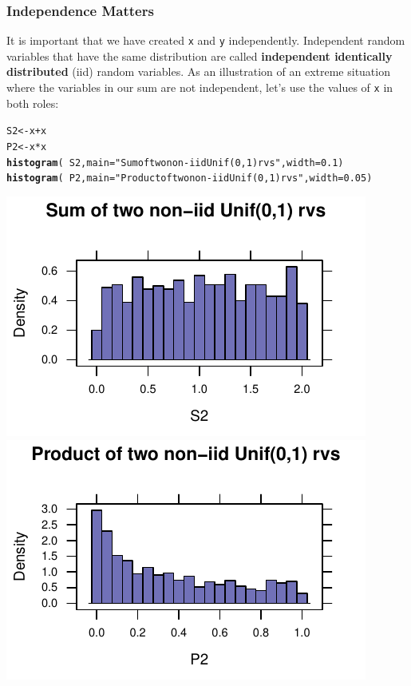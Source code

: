 \documentclass[twoside]{book}\usepackage[]{graphicx}\usepackage[]{xcolor}
\makeatletter
\def\maxwidth{ %
  \ifdim\Gin@nat@width>\linewidth
    \linewidth
  \else
    \Gin@nat@width
  \fi
}
\newcommand{\hlnum}[1]{\textcolor[rgb]{0.686,0.059,0.569}{#1}}%
\newcommand{\hlstr}[1]{\textcolor[rgb]{0.192,0.494,0.8}{#1}}%
\newcommand{\hlopt}[1]{\textcolor[rgb]{0,0,0}{#1}}%
\newcommand{\hlstd}[1]{\textcolor[rgb]{0.345,0.345,0.345}{#1}}%
\newcommand{\hlkwb}[1]{\textcolor[rgb]{0.69,0.353,0.396}{#1}}%
\newcommand{\hlkwc}[1]{\textcolor[rgb]{0.333,0.667,0.333}{#1}}%
\newcommand{\hlkwd}[1]{\textcolor[rgb]{0.737,0.353,0.396}{\textbf{#1}}}%
\newenvironment{kframe}{%
 \def\at@end@of@kframe{}%
 \ifinner\ifhmode%
  \def\at@end@of@kframe{\end{minipage}}%
  \begin{minipage}{\columnwidth}%
 \fi\fi%
 \def\FrameCommand##1{\hskip\@totalleftmargin \hskip-\fboxsep
 \colorbox{shadecolor}{##1}\hskip-\fboxsep
     \hskip-\linewidth \hskip-\@totalleftmargin \hskip\columnwidth}%
 \MakeFramed {\advance\hsize-\width
   \@totalleftmargin\z@ \linewidth\hsize
   \@setminipage}}%
 {\par\unskip\endMakeFramed%
 \at@end@of@kframe}
\newenvironment{knitrout}{}{} %
\def\term#1{\textbf{#1}}
\makeatother
\begin{document}
\subsubsection*{Independence Matters}
It is important that we have created \texttt{x} and \texttt{y} independently.
Independent random variables that have the same distribution are called 
\term{independent identically distributed} (iid) random variables.  As an illustration
of an extreme situation where the variables in our sum are not independent, let's 
use the values of \texttt{x} in both roles:

\begin{knitrout}
\color{fgcolor}\begin{kframe}
\begin{alltt}
\hlstd{S2} \hlkwb{<-} \hlstd{x} \hlopt{+} \hlstd{x}
\hlstd{P2} \hlkwb{<-} \hlstd{x} \hlopt{*} \hlstd{x}
\hlkwd{histogram}\hlstd{(}\hlopt{~}\hlstd{S2,} \hlkwc{main} \hlstd{=} \hlstr{"Sum of two non-iid Unif(0,1) rvs"}\hlstd{,} \hlkwc{width} \hlstd{=} \hlnum{0.1}\hlstd{)}
\hlkwd{histogram}\hlstd{(}\hlopt{~}\hlstd{P2,} \hlkwc{main} \hlstd{=} \hlstr{"Product of two non-iid Unif(0,1) rvs"}\hlstd{,} \hlkwc{width} \hlstd{=} \hlnum{0.05}\hlstd{)}
\end{alltt}
\end{kframe}

{\centering \includegraphics[width=\maxwidth]{figures/fig-sum-product-uniform-non-iid-1} 
\includegraphics[width=\maxwidth]{figures/fig-sum-product-uniform-non-iid-2} 

}



\end{knitrout}
\end{document}
